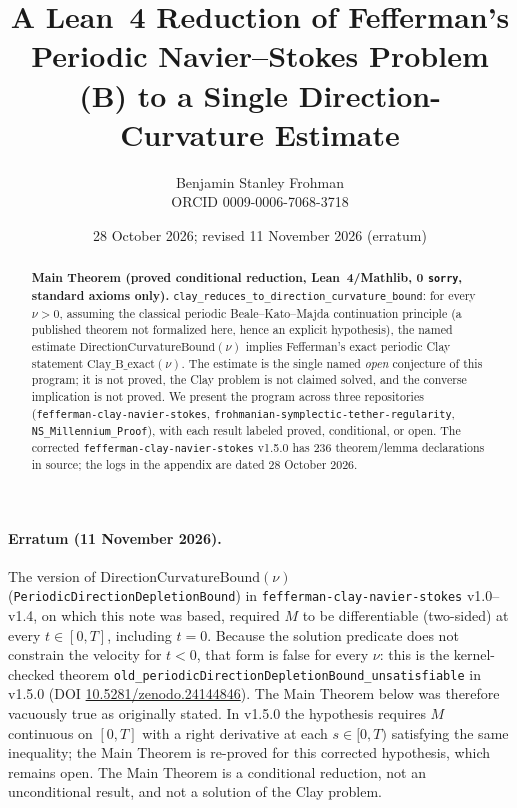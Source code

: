 \documentclass[11pt]{article}
\title{A Lean~4 Reduction of Fefferman's Periodic Navier--Stokes Problem (B) to a Single Direction-Curvature Estimate}
\author{Benjamin Stanley Frohman\\ORCID 0009-0006-7068-3718}
\date{28 October 2026; revised 11 November 2026 (erratum)}
\begin{document}
\maketitle\sloppy
\begin{abstract}
\textbf{Main Theorem (proved conditional reduction, Lean~4/Mathlib, 0 \texttt{sorry}, standard axioms only).} \texttt{clay\_reduces\_to\_direction\_curvature\_bound}: for every $\nu>0$, assuming the classical periodic Beale--Kato--Majda continuation principle (a published theorem not formalized here, hence an explicit hypothesis), the named estimate $\mathrm{DirectionCurvatureBound}(\nu)$ implies Fefferman's exact periodic Clay statement $\mathrm{Clay\_B\_exact}(\nu)$. The estimate is the single named \emph{open} conjecture of this program; it is not proved, the Clay problem is not claimed solved, and the converse implication is not proved. We present the program across three repositories (\texttt{fefferman-clay-navier-stokes}, \texttt{frohmanian-symplectic-tether-regularity}, \texttt{NS\_Millennium\_Proof}), with each result labeled proved, conditional, or open. The corrected \texttt{fefferman-clay-navier-stokes} v1.5.0 has 236 theorem/lemma declarations in source; the logs in the appendix are dated 28 October 2026.
\end{abstract}
\paragraph{Erratum (11 November 2026).} The version of $\mathrm{DirectionCurvatureBound}(\nu)$ (\texttt{PeriodicDirectionDepletionBound}) in \texttt{fefferman-clay-navier-stokes} v1.0--v1.4, on which this note was based, required $M$ to be differentiable (two-sided) at every $t\in[0,T]$, including $t=0$. Because the solution predicate does not constrain the velocity for $t<0$, that form is false for every $\nu$: this is the kernel-checked theorem \texttt{old\_periodicDirectionDepletionBound\_unsatisfiable} in v1.5.0 (DOI \href{https://doi.org/10.5281/zenodo.24144846}{10.5281/zenodo.24144846}). The Main Theorem below was therefore vacuously true as originally stated. In v1.5.0 the hypothesis requires $M$ continuous on $[0,T]$ with a right derivative at each $s\in[0,T)$ satisfying the same inequality; the Main Theorem is re-proved for this corrected hypothesis, which remains open. The Main Theorem is a conditional reduction, not an unconditional result, and not a solution of the Clay problem.
\end{document}
